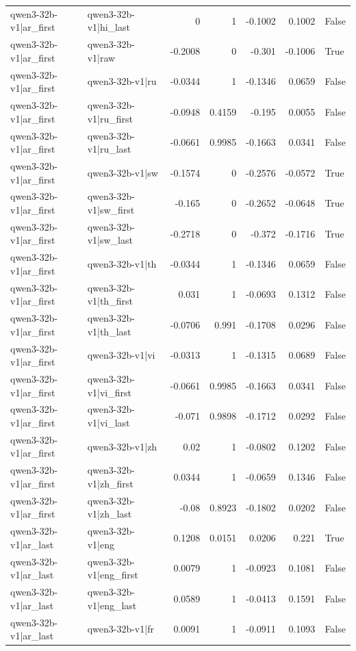 \begin{table}
\begin{tabular}{l l r r r r l}
qwen3-32b-v1|ar_first & qwen3-32b-v1|hi_last & 0 & 1 & -0.1002 & 0.1002 & False \\
qwen3-32b-v1|ar_first & qwen3-32b-v1|raw & -0.2008 & 0 & -0.301 & -0.1006 & True \\
qwen3-32b-v1|ar_first & qwen3-32b-v1|ru & -0.0344 & 1 & -0.1346 & 0.0659 & False \\
qwen3-32b-v1|ar_first & qwen3-32b-v1|ru_first & -0.0948 & 0.4159 & -0.195 & 0.0055 & False \\
qwen3-32b-v1|ar_first & qwen3-32b-v1|ru_last & -0.0661 & 0.9985 & -0.1663 & 0.0341 & False \\
qwen3-32b-v1|ar_first & qwen3-32b-v1|sw & -0.1574 & 0 & -0.2576 & -0.0572 & True \\
qwen3-32b-v1|ar_first & qwen3-32b-v1|sw_first & -0.165 & 0 & -0.2652 & -0.0648 & True \\
qwen3-32b-v1|ar_first & qwen3-32b-v1|sw_last & -0.2718 & 0 & -0.372 & -0.1716 & True \\
qwen3-32b-v1|ar_first & qwen3-32b-v1|th & -0.0344 & 1 & -0.1346 & 0.0659 & False \\
qwen3-32b-v1|ar_first & qwen3-32b-v1|th_first & 0.031 & 1 & -0.0693 & 0.1312 & False \\
qwen3-32b-v1|ar_first & qwen3-32b-v1|th_last & -0.0706 & 0.991 & -0.1708 & 0.0296 & False \\
qwen3-32b-v1|ar_first & qwen3-32b-v1|vi & -0.0313 & 1 & -0.1315 & 0.0689 & False \\
qwen3-32b-v1|ar_first & qwen3-32b-v1|vi_first & -0.0661 & 0.9985 & -0.1663 & 0.0341 & False \\
qwen3-32b-v1|ar_first & qwen3-32b-v1|vi_last & -0.071 & 0.9898 & -0.1712 & 0.0292 & False \\
qwen3-32b-v1|ar_first & qwen3-32b-v1|zh & 0.02 & 1 & -0.0802 & 0.1202 & False \\
qwen3-32b-v1|ar_first & qwen3-32b-v1|zh_first & 0.0344 & 1 & -0.0659 & 0.1346 & False \\
qwen3-32b-v1|ar_first & qwen3-32b-v1|zh_last & -0.08 & 0.8923 & -0.1802 & 0.0202 & False \\
qwen3-32b-v1|ar_last & qwen3-32b-v1|eng & 0.1208 & 0.0151 & 0.0206 & 0.221 & True \\
qwen3-32b-v1|ar_last & qwen3-32b-v1|eng_first & 0.0079 & 1 & -0.0923 & 0.1081 & False \\
qwen3-32b-v1|ar_last & qwen3-32b-v1|eng_last & 0.0589 & 1 & -0.0413 & 0.1591 & False \\
qwen3-32b-v1|ar_last & qwen3-32b-v1|fr & 0.0091 & 1 & -0.0911 & 0.1093 & False \\

\end{tabular}
\end{table}
